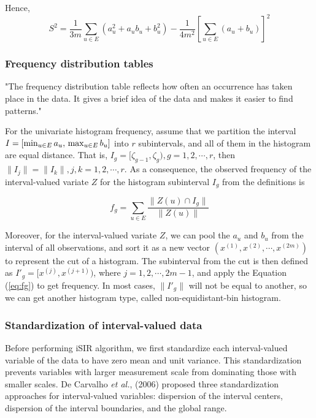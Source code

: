 \documentclass[article]{jss}
\begin{document}
Hence,
\begin{equation}\label{eq:var}
S^2 = \frac{1}{3m} \sum_{u \in E}(a_u^2+a_ub_u+b_u^2)-\frac{1}{4m^2}\left[ \sum_{u \in E}(a_u+b_u) \right]^2
\end{equation}



\subsubsection{Frequency distribution tables}\label{sec:hist}
"The frequency distribution table reflects how often an occurrence has taken place in the data. It gives a brief idea of the data and makes it easier to find patterns."

For the univariate histogram frequency, assume that we partition the interval $I=[\min_{u \in E} a_u,\\ \max_{u \in E} b_u]$ into $r$ subintervals, and all of them in the histogram are equal distance. That is, $I_g = [\zeta_{g-1},\zeta_{g}),g=1,2,\cdots,r$, then $\| I_j \| = \| I_k \| , j,k=1,2,\cdots,r$. As a consequence, the observed frequency of the interval-valued variate $Z$ for the histogram subinterval $I_g$ from the definitions is

\begin{equation}\label{eq:fg}
f_g = \sum_{u \in E}\frac{\| Z(u) \cap I_g \|}{\| Z(u) \|}
\end{equation}

Moreover, for the interval-valued variate $Z$, we can pool the $a_u$ and $b_u$ from the interval of all observations, and sort it as a new vector $(x^{(1)},x^{(2)}, \cdots, x^{(2m)})$ to represent the cut of a histogram. The subinterval from the cut is then defined as $I'_g = [x^{(j)},x^{(j+1)})$, where $j = 1,2,\cdots, 2m-1$, and apply the Equation (\ref{eq:fg}) to get frequency. In most cases, $\| I'_g \|$ will not be equal to another, so we can get another histogram type, called non-equidistant-bin histogram.



\subsubsection{Standardization of interval-valued data}
Before performing iSIR algorithm, we first standardize each
interval-valued variable of the data to have zero mean and unit
variance. This standardization prevents variables with
larger measurement scale from dominating those with
smaller scales. De Carvalho {\it et al.}, (2006) proposed
three standardization approaches for interval-valued
variables:  dispersion of the interval
centers, dispersion of the interval
boundaries, and the global range.
\end{document}
